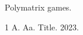 \documentclass{article}
\begin{document}
Polymatrix \citealp{a} games.
\begin{thebibliography}{1}
 A. Aa. Title. 2023.
\end{thebibliography}
\end{document}
